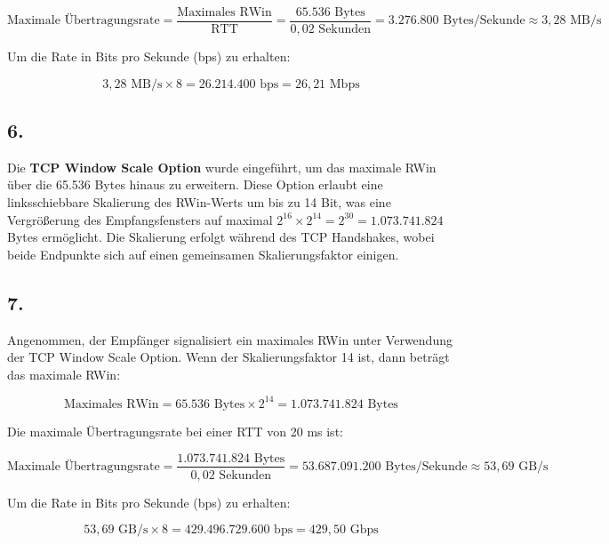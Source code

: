 \documentclass[a4paper]{scrartcl}
\newcounter{punkte}
\begin{document}
\[
\text{Maximale Übertragungsrate} = \frac{\text{Maximales RWin}}{\text{RTT}} = \frac{65.536 \text{ Bytes}}{0,02 \text{ Sekunden}} = 3.276.800 \text{ Bytes/Sekunde} \approx 3,28 \text{ MB/s}
\]

Um die Rate in Bits pro Sekunde (bps) zu erhalten:

\[
3,28 \text{ MB/s} \times 8 = 26.214.400 \text{ bps} = 26,21 \text{ Mbps}
\]

\subsection*{6.}
Die \textbf{TCP Window Scale Option} wurde eingeführt, um das maximale RWin über die 65.536 Bytes hinaus zu erweitern. Diese Option erlaubt eine linksschiebbare Skalierung des RWin-Werts um bis zu 14 Bit, was eine Vergrößerung des Empfangsfensters auf maximal $2^{16} \times 2^{14} = 2^{30} = 1.073.741.824$ Bytes ermöglicht. Die Skalierung erfolgt während des TCP Handshakes, wobei beide Endpunkte sich auf einen gemeinsamen Skalierungsfaktor einigen.

\subsection*{7.}
Angenommen, der Empfänger signalisiert ein maximales RWin unter Verwendung der TCP Window Scale Option. Wenn der Skalierungsfaktor 14 ist, dann beträgt das maximale RWin:

\[
\text{Maximales RWin} = 65.536 \text{ Bytes} \times 2^{14} = 1.073.741.824 \text{ Bytes}
\]

Die maximale Übertragungsrate bei einer RTT von 20 ms ist:

\[
\text{Maximale Übertragungsrate} = \frac{1.073.741.824 \text{ Bytes}}{0,02 \text{ Sekunden}} = 53.687.091.200 \text{ Bytes/Sekunde} \approx 53,69 \text{ GB/s}
\]

Um die Rate in Bits pro Sekunde (bps) zu erhalten:

\[
53,69 \text{ GB/s} \times 8 = 429.496.729.600 \text{ bps} = 429,50 \text{ Gbps}
\]
\end{document}
